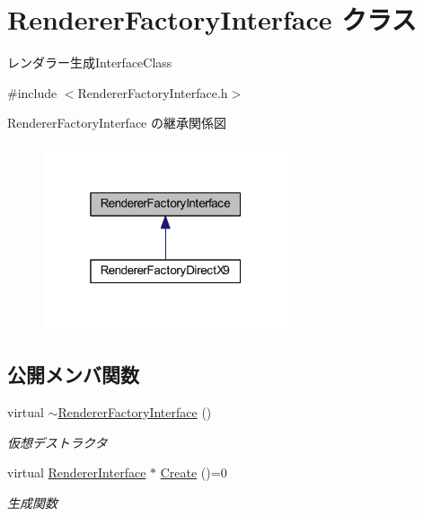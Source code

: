 \hypertarget{class_renderer_factory_interface}{}\section{Renderer\+Factory\+Interface クラス}
\label{class_renderer_factory_interface}


レンダラー生成\+Interface\+Class  




{\ttfamily \#include $<$Renderer\+Factory\+Interface.\+h$>$}



Renderer\+Factory\+Interface の継承関係図\nopagebreak
\begin{figure}[H]
\begin{center}
\leavevmode
\includegraphics[width=205pt]{class_renderer_factory_interface__inherit__graph}
\end{center}
\end{figure}
\subsection*{公開メンバ関数}
\begin{DoxyCompactItemize}
\item 
virtual \mbox{\hyperlink{class_renderer_factory_interface_a4a81c222850b5fbd1cced8a193f7b8ab}{$\sim$\+Renderer\+Factory\+Interface}} ()
\begin{DoxyCompactList}\small\item\em 仮想デストラクタ \end{DoxyCompactList}\item 
virtual \mbox{\hyperlink{class_renderer_interface}{Renderer\+Interface}} $\ast$ \mbox{\hyperlink{class_renderer_factory_interface_aa81911973b6079fda8489409385d71e3}{Create}} ()=0
\begin{DoxyCompactList}\small\item\em 生成関数 \end{DoxyCompactList}\end{DoxyCompactItemize}


